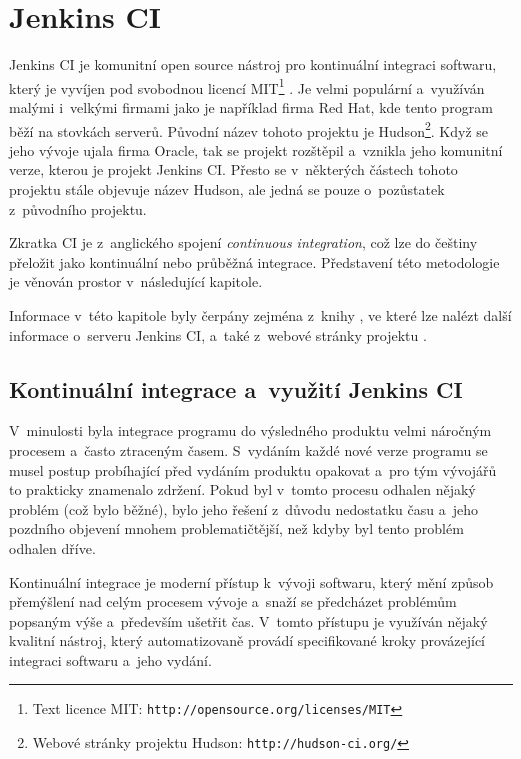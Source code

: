     \section {Jenkins CI} \label{jenkins}
        Jenkins CI je komunitní open source nástroj pro kontinuální integraci softwaru, který je vyvíjen pod svobodnou licencí
        MIT\footnote{Text licence MIT: \texttt{http://opensource.org/licenses/MIT}} \cite{jenkinsGovernance}.
        Je velmi populární a~využíván malými i~velkými firmami jako je například firma Red Hat, kde tento program běží na stovkách serverů.
        Původní název tohoto projektu je Hudson\footnote{Webové stránky projektu Hudson: \texttt{http://hudson-ci.org/}}. 
        Když se jeho vývoje ujala firma Oracle, tak se projekt
        rozštěpil a~vznikla jeho komunitní verze, kterou je projekt Jenkins CI. Přesto se v~některých částech tohoto projektu 
        stále objevuje název Hudson, ale jedná se pouze o~pozůstatek z~původního projektu.

        Zkratka CI je z~anglického spojení \emph{continuous integration}, což lze do češtiny přeložit jako kontinuální nebo průběžná 
        integrace. Představení této metodologie je věnován
        prostor v~následující kapitole.
        
        Informace v~této kapitole byly čerpány zejména  z~knihy \cite{jenkinsBook}, ve které lze nalézt další informace o~serveru Jenkins CI,
        a~také z~webové stránky projektu \cite{jenkinsWeb}.

        \subsection{Kontinuální integrace a~využití Jenkins CI}
            V~minulosti byla integrace programu do výsledného produktu velmi náročným procesem a~často ztraceným časem.
            S~vydáním každé nové verze programu se musel postup probíhající před vydáním produktu opakovat a~pro tým vývojářů
            to prakticky znamenalo zdržení. Pokud byl v~tomto procesu odhalen nějaký problém (což bylo běžné),
            bylo jeho řešení z~důvodu nedostatku času a~jeho pozdního objevení mnohem problematičtější,
            než kdyby byl tento problém odhalen dříve.

            Kontinuální integrace je moderní přístup k~vývoji softwaru, který mění způsob přemýšlení nad celým procesem vývoje
            a~snaží se předcházet problémům popsaným výše a~především ušetřit čas. V~tomto přístupu je využíván nějaký
            kvalitní nástroj, který automatizovaně provádí specifikované kroky provázející integraci softwaru a~jeho vydání.

